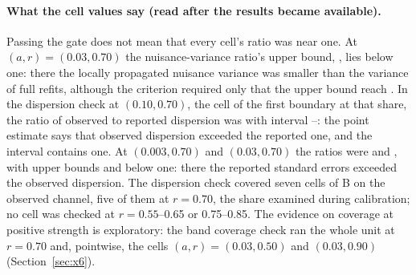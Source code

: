 \paragraph{What the cell values say (read after the results became available).}
Passing the gate does not mean that every cell's ratio was near one. At $(a,r)=(0.03,0.70)$ the nuisance-variance ratio's upper bound, , lies below one: there the locally propagated nuisance variance was smaller than the variance of full refits, although the criterion required only that the upper bound reach . In the dispersion check at $(0.10,0.70)$, the cell of the first boundary at that share, the ratio of observed to reported dispersion was  with interval --: the point estimate says that observed dispersion exceeded the reported one, and the interval contains one. At $(0.003,0.70)$ and $(0.03,0.70)$ the ratios were  and , with upper bounds  and  below one: there the reported standard errors exceeded the observed dispersion. The dispersion check covered seven cells of B on the observed channel, five of them at $r=0.70$, the share examined during calibration; no cell was checked at $r=0.55$--0.65 or 0.75--0.85. The evidence on coverage at positive strength is exploratory: the band coverage check ran the whole unit at $r=0.70$ and, pointwise, the cells $(a,r)=(0.03,0.50)$ and $(0.03,0.90)$ (Section~\ref{sec:x6}).

